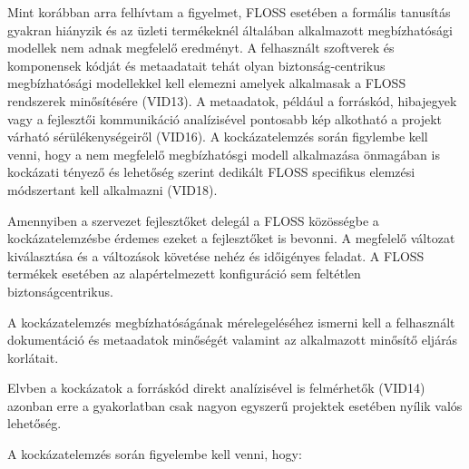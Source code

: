\documentclass[12pt,magyar,a4paper,oneside]{scrreprt}
\begin{document}
Mint korábban arra felhívtam a figyelmet, FLOSS esetében a formális
tanusítás gyakran hiányzik és az üzleti termékeknél általában
alkalmazott megbízhatósági modellek nem adnak megfelelő eredményt. A
felhasznált szoftverek és komponensek kódját és metaadatait tehát olyan
biztonság-centrikus megbízhatósági modellekkel kell elemezni amelyek
alkalmasak a FLOSS rendszerek minősítésére (VID13). A metaadatok,
például a forráskód, hibajegyek vagy a fejlesztői kommunikáció
analízisével pontosabb kép alkotható a projekt várható
sérülékenységeiről (VID16). A kockázatelemzés során figylembe kell
venni, hogy a nem megfelelő megbízhatósgi modell alkalmazása önmagában
is kockázati tényező és lehetőség szerint dedikált FLOSS specifikus
elemzési módszertant kell alkalmazni (VID18).

Amennyiben a szervezet fejlesztőket delegál a FLOSS közösségbe a
kockázatelemzésbe érdemes ezeket a fejlesztőket is bevonni. A megfelelő
változat kiválasztása és a változások követése nehéz és időigényes
feladat. A FLOSS termékek esetében az alapértelmezett konfiguráció sem
feltétlen biztonságcentrikus.

A kockázatelemzés megbízhatóságának mérelegeléséhez ismerni kell a
felhasznált dokumentáció és metaadatok minőségét valamint az alkalmazott
minősítő eljárás korlátait.

Elvben a kockázatok a forráskód direkt analízisével is felmérhetők
(VID14) azonban erre a gyakorlatban csak nagyon egyszerű projektek
esetében nyílik valós lehetőség.

A kockázatelemzés során figyelembe kell venni, hogy:
\end{document}
